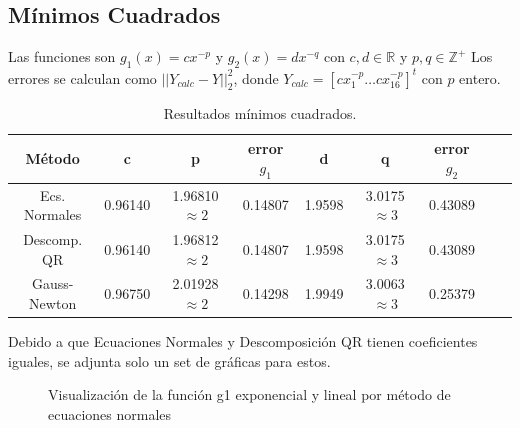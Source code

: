 \documentclass{endm}
\begin{document}
\subsection{Mínimos Cuadrados}
Las funciones son $g_1(x)=c x^{-p} $ y $g_2(x)=d x^{-q} $ con $c,d \in \mathbb{R}$ y $p,q \in \mathbb{Z^+}$
Los errores se calculan como $||Y_{calc} - Y ||^2_2$, donde $Y_{calc} = [cx_1^{-p} \dots cx_{16}^{-p}]^t$ con $p$ entero.
\begin{table}[h!]
    \begin{center}
      \caption{Resultados mínimos cuadrados.}
      \label{tab:table1}
      \begin{tabular}{c|c|c|c|c|c|c|c|c} %
        \textbf{Método} & \textbf{c} & \textbf{p} & \textbf{error $g_1$} & \textbf{d} & \textbf{q} & \textbf{error $g_2$} \\
        \hline
        Ecs. Normales & 0.96140 & 1.96810 $\approx 2$ & 0.14807 & 1.9598 & 3.0175 $\approx 3$ & 0.43089 \\
        Descomp. QR   & 0.96140 & 1.96812 $\approx 2$ & 0.14807 & 1.9598 & 3.0175 $\approx 3$ & 0.43089 \\
        Gauss-Newton  & 0.96750 & 2.01928 $\approx 2$ & 0.14298 & 1.9949 & 3.0063 $\approx 3$ & 0.25379 \\
      \end{tabular}
    \end{center}
  \end{table}
\clearpage
Debido a que Ecuaciones Normales y Descomposición QR tienen coeficientes iguales, se adjunta solo un set de gráficas para estos.
\begin{figure}%
    \centering
    \qquad
    \caption{Visualización de la función g1 exponencial y lineal por método de ecuaciones normales}%
    \label{fig:example}%
\end{figure}
\end{document}
